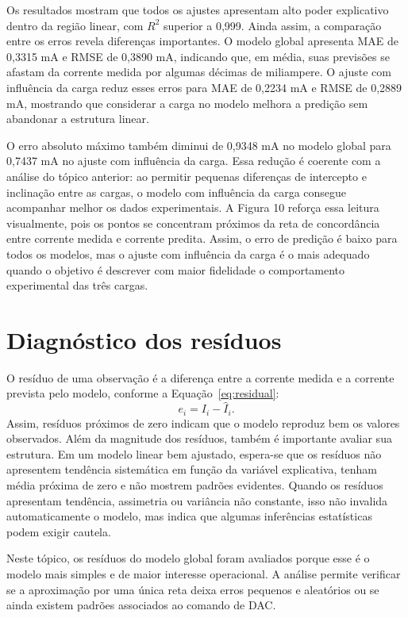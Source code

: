 \documentclass[
  brazilian,
]{article}
\renewcommand{\_}{\oldunderscore\discretionary{}{}{}}
\begin{document}
Os resultados mostram que todos os ajustes apresentam alto poder
explicativo dentro da região linear, com \(R^2\) superior a 0,999. Ainda
assim, a comparação entre os erros revela diferenças importantes. O modelo
global apresenta MAE de 0,3315 mA e RMSE de 0,3890 mA, indicando que, em
média, suas previsões se afastam da corrente medida por algumas décimas de
miliampere. O ajuste com influência da carga reduz esses erros para MAE de
0,2234 mA e RMSE de 0,2889 mA, mostrando que considerar a carga no modelo
melhora a predição sem abandonar a estrutura linear.

O erro absoluto máximo também diminui de 0,9348 mA no modelo global para
0,7437 mA no ajuste com influência da carga. Essa redução é coerente com a análise
do tópico anterior: ao permitir pequenas diferenças de intercepto e
inclinação entre as cargas, o modelo com influência da carga consegue acompanhar
melhor os dados experimentais. A Figura 10 reforça essa leitura
visualmente, pois os pontos se concentram próximos da reta de concordância
entre corrente medida e corrente predita. Assim, o erro de predição é
baixo para todos os modelos, mas o ajuste com influência da carga é o mais adequado
quando o objetivo é descrever com maior fidelidade o comportamento
experimental das três cargas.

\FloatBarrier

\section{Diagnóstico dos resíduos}\label{diagnuxf3stico-dos-resuxedduos}

O resíduo de uma observação é a diferença entre a corrente medida e a
corrente prevista pelo modelo, conforme a Equação~\ref{eq:residual}:
\begin{equation}
e_i = I_i - \hat{I}_i.
\label{eq:residual}
\end{equation}
Assim, resíduos próximos de zero indicam que o modelo reproduz bem os
valores observados. Além da magnitude dos resíduos, também é importante
avaliar sua estrutura. Em um modelo linear bem ajustado, espera-se que os
resíduos não apresentem tendência sistemática em função da variável
explicativa, tenham média próxima de zero e não mostrem padrões evidentes.
Quando os resíduos apresentam tendência, assimetria ou variância não
constante, isso não invalida automaticamente o modelo, mas indica que
algumas inferências estatísticas podem exigir cautela.

Neste tópico, os resíduos do modelo global foram avaliados porque esse é
o modelo mais simples e de maior interesse operacional. A análise permite
verificar se a aproximação por uma única reta deixa erros pequenos e
aleatórios ou se ainda existem padrões associados ao comando de DAC.
\end{document}
